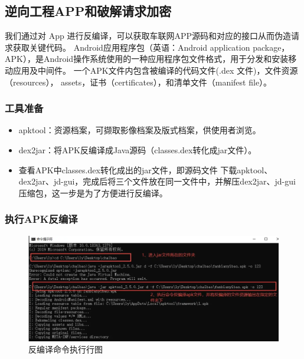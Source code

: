 \subsection{逆向工程APP和破解请求加密}
我们通过对 App 进行反编译\cite{yang2015automated}，可以获取车联网APP源码和对应的接口从而伪造请求获取关键代码。
Android应用程序包（英语：Android application package，APK），是Android操作系统使用的一种应用程序包文件格式，用于分发和安装移动应用及中间件。
一个APK文件内包含被编译的代码文件(.dex 文件)，文件资源（resources）， assets，证书（certificates），和清单文件（manifest file）。

\subsubsection{工具准备}
\begin{itemize}
    \item apktool：资源档案，可撷取影像档案及版式档案，供使用者浏览。        
    \item dex2jar：将APK反编译成Java源码（classes.dex转化成jar文件）。
    \item 查看APK中classes.dex转化成出的jar文件，即源码文件 下载apktool、dex2jar、jd-gui，完成后将三个文件放在同一文件中，并解压dex2jar、jd-gui压缩包，这一步是为了方便进行反编译。
\end{itemize}

\subsubsection{执行APK反编译}
\begin{figure}
    \centering
    \includegraphics[scale=0.5]{resources/img/i19.png}
    \caption{反编译命令执行行图}
  \end{figure}

